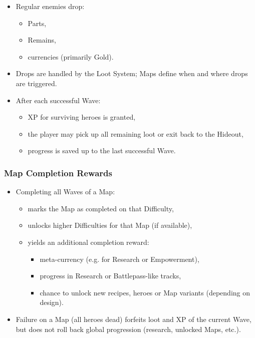 \begin{itemize}
	\item Regular enemies drop:
	\begin{itemize}
		\item Parts,
		\item Remains,
		\item currencies (primarily Gold).
	\end{itemize}
	\item Drops are handled by the Loot System; Maps define when and where drops are triggered.
	\item After each successful Wave:
	\begin{itemize}
		\item XP for surviving heroes is granted,
		\item the player may pick up all remaining loot or exit back to the Hideout,
		\item progress is saved up to the last successful Wave.
	\end{itemize}
\end{itemize}

\subsubsection*{Map Completion Rewards}

\begin{itemize}
	\item Completing all Waves of a Map:
	\begin{itemize}
		\item marks the Map as completed on that Difficulty,
		\item unlocks higher Difficulties for that Map (if available),
		\item yields an additional completion reward:
		\begin{itemize}
			\item meta-currency (e.g. for Research or Empowerment),
			\item progress in Research or Battlepass-like tracks,
			\item chance to unlock new recipes, heroes or Map variants (depending on design).
		\end{itemize}
	\end{itemize}
	\item Failure on a Map (all heroes dead) forfeits loot and XP of the current Wave, 
	but does not roll back global progression (research, unlocked Maps, etc.).
\end{itemize}

